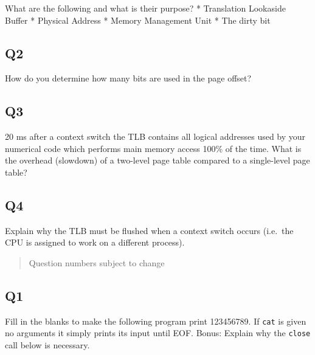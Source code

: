 What are the following and what is their purpose? * Translation
Lookaside Buffer * Physical Address * Memory Management Unit * The dirty
bit

\subsection{Q2}\label{q2-2}

How do you determine how many bits are used in the page offset?

\subsection{Q3}\label{q3-2}

20 ms after a context switch the TLB contains all logical addresses used
by your numerical code which performs main memory access 100\% of the
time. What is the overhead (slowdown) of a two-level page table compared
to a single-level page table?

\subsection{Q4}\label{q4-2}

Explain why the TLB must be flushed when a context switch occurs
(i.e.~the CPU is assigned to work on a different process).

\begin{quote}
Question numbers subject to change
\end{quote}

\subsection{Q1}\label{q1-3}

Fill in the blanks to make the following program print 123456789. If
\texttt{cat} is given no arguments it simply prints its input until EOF.
Bonus: Explain why the \texttt{close} call below is necessary.

